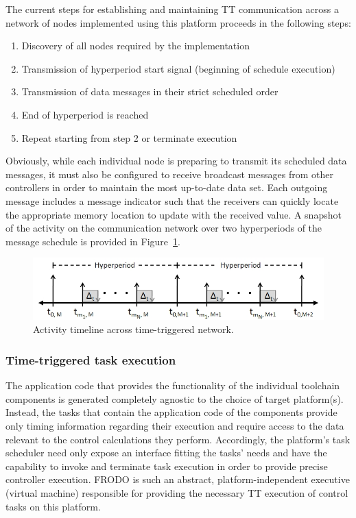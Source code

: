 The current steps for establishing and maintaining TT communication across a network of nodes implemented using this platform proceeds in the following steps:
\begin{enumerate}
\setlength{\itemsep}{1pt}
\setlength{\parskip}{0pt}
\setlength{\parsep}{0pt}
\item Discovery of all nodes required by the implementation
\item Transmission of hyperperiod start signal (beginning of schedule execution)
\item Transmission of data messages in their strict scheduled order
\item End of hyperperiod is reached
\item Repeat starting from step 2 or terminate execution
\end{enumerate}
Obviously, while each individual node is preparing to transmit its scheduled data messages, it must also be configured to receive broadcast messages from other controllers in order to maintain the most up-to-date data set.  Each outgoing message includes a message indicator such that the receivers can quickly locate the appropriate memory location to update with the received value.  A snapshot of the activity on the communication network over two hyperperiods of the message schedule is provided in Figure~\ref{fig:FRODOTimeline}.

\begin{figure}[h]
   \centering
   \includegraphics[width=0.95\columnwidth]{FRODOTimeline}
   \caption{Activity timeline across time-triggered network.}
   \label{fig:FRODOTimeline}
\end{figure}

\subsubsection*{Time-triggered task execution}
The application code that provides the functionality of the individual toolchain components is generated completely agnostic to the choice of target platform(s).  Instead, the tasks that contain the application code of the components provide only timing information regarding their execution and require access to the data relevant to the control calculations they perform.  Accordingly, the platform's task scheduler need only expose an interface fitting the tasks' needs and have the capability to invoke and terminate task execution in order to provide precise controller execution.  FRODO is such an abstract, platform-independent executive (virtual machine) responsible for providing the necessary TT execution of control tasks on this platform.

